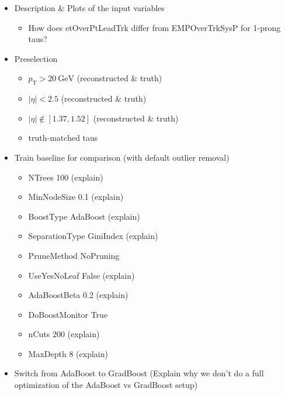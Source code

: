 
\begin{itemize}
\item Description \& Plots of the input variables
  \begin{itemize}
  \item How does etOverPtLeadTrk differ from EMPOverTrkSysP for 1-prong taus?
  \end{itemize}

\item Preselection
  \begin{itemize}
  \item $p_\mathrm{T} > \SI{20}{\GeV}$ (reconstructed \& truth)
  \item $| \eta | < 2.5$ (reconstructed \& truth)
  \item $| \eta | \notin \left[ 1.37, 1.52 \right]$ (reconstructed \& truth)
  \item truth-matched taus
  \end{itemize}

\item Train baseline for comparison (with default outlier removal)
  \begin{itemize}
  \item NTrees 100 (explain)
  \item MinNodeSize 0.1 (explain)
  \item BoostType AdaBoost (explain)
  \item SeparationType GiniIndex (explain)
  \item PruneMethod NoPruning
  \item UseYesNoLeaf False (explain)
  \item AdaBoostBeta 0.2 (explain)
  \item DoBoostMonitor True
  \item nCuts 200 (explain)
  \item MaxDepth 8 (explain)
  \end{itemize}

\item Switch from AdaBoost to GradBoost (Explain why we don't do a full
  optimization of the AdaBoost vs GradBoost setup)


\end{itemize}
